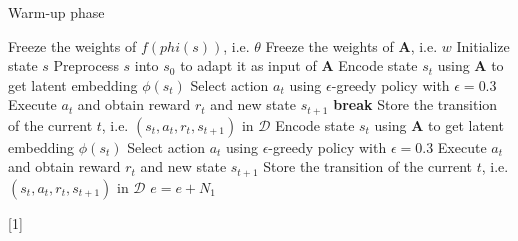 \documentclass[a4paper,12pt,oneside]{article}
\numberwithin{equation}{section}
\begin{document}
    \clearpage
    \begin{algorithm}
    \caption{Warm-up phase}
        \begin{algorithmic}[1]
            \State Freeze the weights of \(f(phi(s))\), i.e. $\theta$
            \State Freeze the weights of $\mathbf{A}$, i.e. \(w\)
            \State Initialize state \(s\) 
            \State Preprocess \(s\) into \(s_0\) to adapt it as input of $\mathbf{A}$
                \State Encode state \(s_t\) using $\mathbf{A}$ to get latent embedding $\phi(s_t)$
                \State Select action $a_t$ using $\epsilon$-greedy policy with $\epsilon=0.3$
                \State Execute $a_t$ and obtain reward $r_t$ and new state $s_{t+1}$
                    \State \textbf{break}
                \EndIf
                \State Store the transition of the current \(t\), i.e. $(s_t, a_t, r_t, s_{t+1})$ in $\mathcal{D}$
                \State Encode state \(s_t\) using $\mathbf{A}$ to get latent embedding $\phi(s_t)$
                \State Select action $a_t$ using $\epsilon$-greedy policy with $\epsilon=0.3$
                \State Execute $a_t$ and obtain reward $r_t$ and new state $s_{t+1}$
                \State Store the transition of the current \(t\), i.e. $(s_t, a_t, r_t, s_{t+1})$ in $\mathcal{D}$
            \EndFor
        \EndFor
        \State $e=e+N_1$
        \end{algorithmic}[1]
    \end{algorithm}
    
\end{document}

